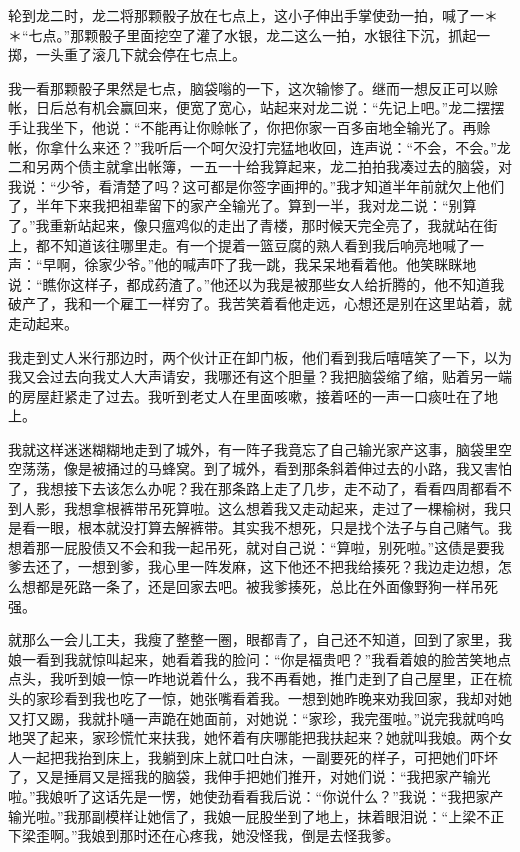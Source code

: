 \documentclass[12pt,UTF8]{ctexbook}
\begin{document}
轮到龙二时，龙二将那颗骰子放在七点上，这小子伸出手掌使劲一拍，喊了一＊＊“七点。”那颗骰子里面挖空了灌了水银，龙二这么一拍，水银往下沉，抓起一掷，一头重了滚几下就会停在七点上。

我一看那颗骰子果然是七点，脑袋嗡的一下，这次输惨了。继而一想反正可以赊帐，日后总有机会赢回来，便宽了宽心，站起来对龙二说：“先记上吧。”龙二摆摆手让我坐下，他说：“不能再让你赊帐了，你把你家一百多亩地全输光了。再赊帐，你拿什么来还？”我听后一个呵欠没打完猛地收回，连声说：“不会，不会。”龙二和另两个债主就拿出帐簿，一五一十给我算起来，龙二拍拍我凑过去的脑袋，对我说：“少爷，看清楚了吗？这可都是你签字画押的。”我才知道半年前就欠上他们了，半年下来我把祖辈留下的家产全输光了。算到一半，我对龙二说：“别算了。”我重新站起来，像只瘟鸡似的走出了青楼，那时候天完全亮了，我就站在街上，都不知道该往哪里走。有一个提着一篮豆腐的熟人看到我后响亮地喊了一声：“早啊，徐家少爷。”他的喊声吓了我一跳，我呆呆地看着他。他笑眯眯地说：“瞧你这样子，都成药渣了。”他还以为我是被那些女人给折腾的，他不知道我破产了，我和一个雇工一样穷了。我苦笑着看他走远，心想还是别在这里站着，就走动起来。

我走到丈人米行那边时，两个伙计正在卸门板，他们看到我后嘻嘻笑了一下，以为我又会过去向我丈人大声请安，我哪还有这个胆量？我把脑袋缩了缩，贴着另一端的房屋赶紧走了过去。我听到老丈人在里面咳嗽，接着呸的一声一口痰吐在了地上。

我就这样迷迷糊糊地走到了城外，有一阵子我竟忘了自己输光家产这事，脑袋里空空荡荡，像是被捅过的马蜂窝。到了城外，看到那条斜着伸过去的小路，我又害怕了，我想接下去该怎么办呢？我在那条路上走了几步，走不动了，看看四周都看不到人影，我想拿根裤带吊死算啦。这么想着我又走动起来，走过了一棵榆树，我只是看一眼，根本就没打算去解裤带。其实我不想死，只是找个法子与自己赌气。我想着那一屁股债又不会和我一起吊死，就对自己说：“算啦，别死啦。”这债是要我爹去还了，一想到爹，我心里一阵发麻，这下他还不把我给揍死？我边走边想，怎么想都是死路一条了，还是回家去吧。被我爹揍死，总比在外面像野狗一样吊死强。

就那么一会儿工夫，我瘦了整整一圈，眼都青了，自己还不知道，回到了家里，我娘一看到我就惊叫起来，她看着我的脸问：“你是福贵吧？”我看着娘的脸苦笑地点点头，我听到娘一惊一咋地说着什么，我不再看她，推门走到了自己屋里，正在梳头的家珍看到我也吃了一惊，她张嘴看着我。一想到她昨晚来劝我回家，我却对她又打又踢，我就扑嗵一声跪在她面前，对她说：“家珍，我完蛋啦。”说完我就呜呜地哭了起来，家珍慌忙来扶我，她怀着有庆哪能把我扶起来？她就叫我娘。两个女人一起把我抬到床上，我躺到床上就口吐白沫，一副要死的样子，可把她们吓坏了，又是捶肩又是摇我的脑袋，我伸手把她们推开，对她们说：“我把家产输光啦。”我娘听了这话先是一愣，她使劲看看我后说：“你说什么？”我说：“我把家产输光啦。”我那副模样让她信了，我娘一屁股坐到了地上，抹着眼泪说：“上梁不正下梁歪啊。”我娘到那时还在心疼我，她没怪我，倒是去怪我爹。
\end{document}
